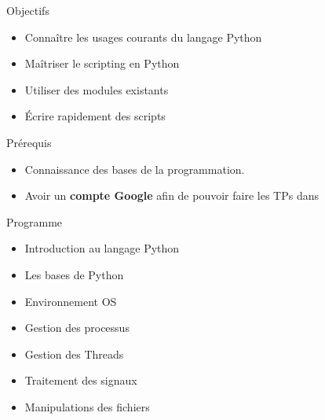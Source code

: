 \begin{frame}{Objectifs}
  \begin{itemize}
    \item Connaître les usages courants du langage Python
    \item Maîtriser le scripting en Python
    \item Utiliser des modules existants
    \item Écrire rapidement des scripts
  \end{itemize}
\end{frame}

\begin{frame}{Prérequis}
  \begin{itemize}
  \item Connaissance des bases de la programmation.
  \item Avoir un \textbf{compte Google} afin de pouvoir faire les TPs dans 
  \end{itemize}
\end{frame}

\begin{frame}{Programme}
  \begin{itemize}
    \item Introduction au langage Python
    \item Les bases de Python
    \item Environnement OS
    \item Gestion des processus
    \item Gestion des Threads
    \item Traitement des signaux
    \item Manipulations des fichiers
  \end{itemize}
\end{frame}
